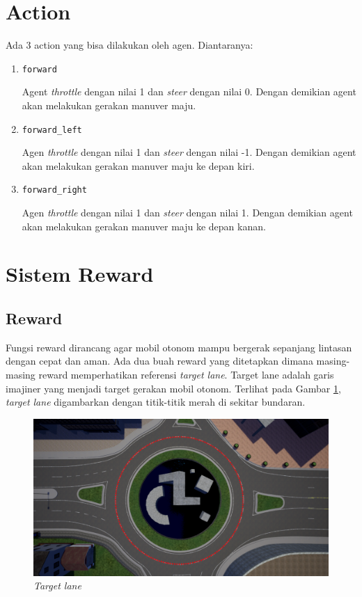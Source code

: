\section{Action}
\label{sec:action}
Ada 3 action yang bisa dilakukan oleh agen. Diantaranya:

\begin{enumerate}[nolistsep]
	\item \verb=forward=
	
	Agent \textit{throttle} dengan nilai 1 dan \textit{steer} dengan nilai 0. Dengan demikian agent akan melakukan gerakan manuver maju.
	
	\item \verb=forward_left=
	
	Agen \textit{throttle} dengan nilai 1 dan \textit{steer} dengan nilai -1. Dengan demikian agent akan melakukan gerakan manuver maju ke depan kiri.

	\item \verb=forward_right=
	
	Agen \textit{throttle} dengan nilai 1 dan \textit{steer} dengan nilai 1. Dengan demikian agent akan melakukan gerakan manuver maju ke depan kanan.
	
\end{enumerate}

\section{Sistem Reward}
\label{sec:sistem_reward}

\subsection{Reward}
\label{sec:reward}
Fungsi reward dirancang agar mobil otonom mampu bergerak sepanjang lintasan dengan cepat dan aman. Ada dua buah reward yang ditetapkan dimana masing-masing reward memperhatikan referensi \textit{target lane}. Target lane adalah garis imajiner yang menjadi target gerakan mobil otonom. Terlihat pada Gambar \ref{fig:target_lane_line}, \textit{target lane} digambarkan dengan titik-titik merah di sekitar bundaran.

\begin{figure}[H] 
	\centering
	\includegraphics[width=1\linewidth]{images/target_lane_line}
	\caption{\textit{Target lane}}
	\label{fig:target_lane_line}
\end{figure}

